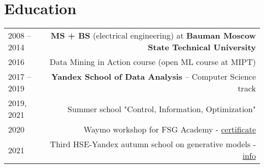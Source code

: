 \section*{Education}
\begin{tabular}{@{}L!{\VRule}R}
    2008 -- 2014 & \textbf{MS + BS} (electrical engineering) at \textbf{Bauman Moscow State Technical University} \\
    2016         & Data Mining in Action course (open ML course at MIPT)                                          \\
    2017 -- 2019 & \textbf{Yandex School of Data Analysis} -- Computer Science track    \\
    2019, 2021 & Summer school "Control, Information, Optimization" \\
    2020 & Waymo workshop for FSG Academy - \href{https://drive.google.com/file/d/1-WxECccxBrRWIvEt9WQeXKTueiF658r7/view?usp=sharing}{certificate} \\ 
    2021 & Third HSE-Yandex autumn school on generative models - \href{https://indico.cern.ch/event/1082512/timetable/#20211123}{info}\\
\end{tabular}
